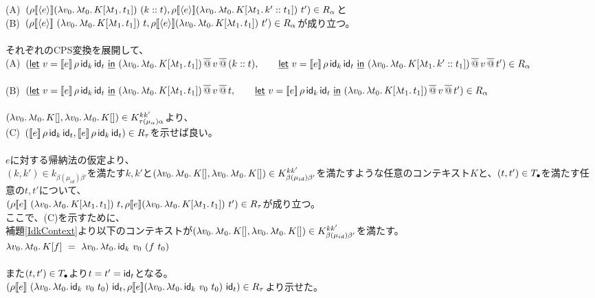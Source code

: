 \documentclass[japanese,draft]{jssst_ppl} %
\begin{document}
  (A)\ $(\rho \CPSTh{\Prompt{e}} \LamP{v_0}{\Lam{t_0}{K[\Lam{t_1}{t_1}]}}\ (\Cons{k}{t}), \rho \CPSTh{\Prompt{e}} \LamP{v_0}{\Lam{t_0}{K[\Lam{t_1}{\Cons{k'}{t_1}}]}}\ t')\in R_{\alpha}$と\\
(B)\ $(\rho \CPSTh{\Prompt{e}}\ \LamP{v_0}{\Lam{t_0}{K[\Lam{t_1}{t_1}]}}\ t, \rho \CPSTh{\Prompt{e}} \LamP{v_0}{\Lam{t_0}{K[\Lam{t_1}{t_1}]}}\ t')\in R_{\alpha}$が成り立つ。\\
\\
それぞれのCPS変換を展開して、\\
(A)\ $(\underline{\textsf{let}}\ v=[\![{e}]\!]\,\rho\,\textsf{id}_k\,\textsf{id}_t\ \underline{\textsf{in}}\ {{(\lambda{v_0}.\,{\lambda{t_0}.\,{K[\lambda{t_1}.\,{t_1}]}})}\,\overline{@}\,{v}}\,\overline{@}\,{(k::t)},\\
\qquad   \underline{\textsf{let}}\ v=[\![{e}]\!]\,\rho\,\textsf{id}_k\,\textsf{id}_t\ \underline{\textsf{in}}\ {{(\lambda{v_0}.\,{\lambda{t_0}.\,{K[\lambda{t_1}.\,{k'::t_1}]}})}\,\overline{@}\,{v}}\,\overline{@}\,{t'})\in R_{\alpha}$ \\
\\
(B)\ $(\underline{\textsf{let}}\ v=[\![{e}]\!]\,\rho\,\textsf{id}_k\,\textsf{id}_t\ \underline{\textsf{in}}\ {{(\lambda{v_0}.\,{\lambda{t_0}.\,{K[\lambda{t_1}.\,{t_1}]}})}\,\overline{@}\,{v}}\,\overline{@}\,{t},\\
\qquad  \underline{\textsf{let}}\ v=[\![{e}]\!]\,\rho\,\textsf{id}_k\,\textsf{id}_t\ \underline{\textsf{in}}\ {{(\lambda{v_0}.\,{\lambda{t_0}.\,{K[\lambda{t_1}.\,{t_1}]}})}\,\overline{@}\,{v}}\,\overline{@}\,{t'})\in R_{\alpha}$ \\
\\
$(\lambda{v_0}.\,{\lambda{t_0}.\,{K[]}}, \lambda{v_0}.\,{\lambda{t_0}.\,{K[]}})\in  K^{kk'}_{\tau(\mu_{\alpha})\alpha}$より、\\
(C)\ $([\![{e}]\!]\,\rho\,\textsf{id}_k\,\textsf{id}_t,[\![{e}]\!]\,\rho\,\textsf{id}_k\,\textsf{id}_t)\in R_{\tau}$を示せば良い。\\
\\
$e$に対する帰納法の仮定より、\\
$(k,k')\in k_{\beta(\mu_{id})\beta'}$を満たす$k,k'$と$(\lambda{v_0}.\,{\lambda{t_0}.\,{K[]}}, \lambda{v_0}.\,{\lambda{t_0}.\,{K[]}})\in  K^{kk'}_{\beta(\mu_{id})\beta'}$を満たすような任意のコンテキスト$K$と、$(t, t') \in T_{\bullet}$を満たす任意の$t, t'$について、\\
$(\rho \CPSTh{e}\ \LamP{v_0}{\Lam{t_0}{K[\Lam{t_1}{t_1}]}}\ t, \rho \CPSTh{e} \LamP{v_0}{\Lam{t_0}{K[\Lam{t_1}{t_1}]}}\ t')\in R_{\tau}$が成り立つ。\\
ここで、(C)を示すために、\\
補題\ref{IdkContext}より以下のコンテキストが$(\lambda{v_0}.\,{\lambda{t_0}.\,{K[]}}, \lambda{v_0}.\,{\lambda{t_0}.\,{K[]}})\in  K^{kk'}_{\beta(\mu_{id})\beta'}$を満たす。\\
$\Lam{v_0}{\Lam{t_0}{K[f]}}\ =\ \Lam{v_0}{\Lam{t_0}{\Idk\ v_0\ (f\ t_0)}}$\\
\\
また$(t, t') \in T_{\bullet}$より$t=t'=\textsf{id}_t$となる。\\
$(\rho \CPSTh{e}\ \LamP{v_0}{\Lam{t_0}{\Idk\ v_0\ t_0}}\ \Idt, \rho \CPSTh{e} \LamP{v_0}{\Lam{t_0}{\Idk\ v_0\ t_0}}\ \Idt)\in R_{\tau}$より示せた。
\end{document}
